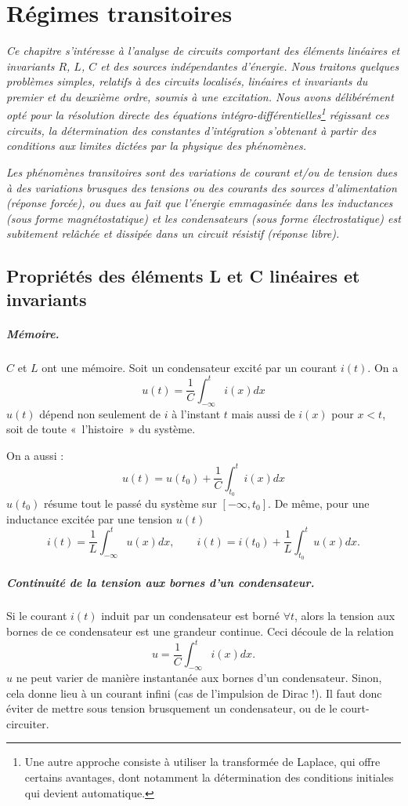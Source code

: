 \chapter{Régimes transitoires}
\label{cha:RLC}

\textit{Ce chapitre s'intéresse à l'analyse de circuits comportant  des éléments linéaires et invariants $R$, $L$, $C$ et des sources indépendantes d'énergie.
Nous traitons quelques problèmes simples, relatifs à des circuits
localisés, linéaires et invariants du premier et du deuxième ordre, soumis à une excitation.
Nous avons délibérément opté pour la résolution directe des équations intégro-différentielles\footnote{Une autre approche consiste à utiliser la transformée de Laplace, qui offre certains avantages, dont notamment la détermination des conditions initiales qui devient automatique.} régissant ces circuits, la détermination des constantes d'intégration s'obtenant à partir des conditions aux limites dictées par la physique des phénomènes. }

\textit{Les phénomènes transitoires sont des variations de
courant et/ou de tension dues à des variations brusques des tensions ou des
courants des sources d'alimentation (réponse forcée), ou dues au fait que l'énergie emmagasinée dans les inductances (sous forme magnétostatique) et les condensateurs (sous forme électrostatique) est subitement relâchée et dissipée dans un circuit résistif (réponse libre).}


\section{Propriétés des éléments L et C linéaires et invariants}

\paragraph{Mémoire. }$C$ et $L$ ont une mémoire.
	Soit un condensateur excité par un courant $i(t)$. On a 
	\[u(t)=\frac{1}{C}\int_{-\infty}^ti(x)dx\]
	$u(t)$ dépend non seulement de $i$ à l'instant $t$ mais aussi de
	$i(x)$ pour $x< t$, soit de toute «~l'histoire~» du système.
	
	On a aussi :
	{\small \[u(t)=u(t_0)+\frac{1}{C}\int_{t_0}^t i(x)dx\]}
	$u(t_0)$ résume tout le passé du système sur $[-\infty,t_0]$.
		De même, pour une inductance excitée par une tension $u(t)$
	\[
	i(t)=\frac{1}{L}\int_{-\infty}^tu(x)dx, \qquad
	i(t)=i(t_0)+\frac{1}{L}\int_{t_0}^tu(x)dx.\]

\paragraph{Continuité de la tension aux bornes d'un condensateur.}
	Si le courant $i(t)$ induit par un condensateur est borné 
	$\forall t$, alors la tension aux bornes de ce condensateur est une grandeur continue.
	Ceci découle de la relation 
	\[u=\frac{1}{C}\int_{-\infty}^ti(x)dx.\]
	$u$ ne peut varier de manière instantanée aux bornes d'un
	condensateur.
	Sinon, cela donne lieu à un courant infini (cas de l'impulsion de Dirac !).
	Il faut donc éviter de mettre sous tension brusquement un condensateur, ou de le court-circuiter.

